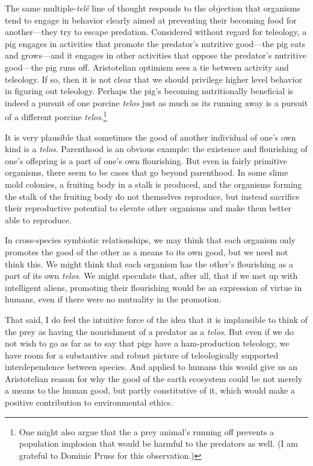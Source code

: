 The same multiple-\textit{tel\^e} line of thought responds to the objection that organisms tend 
to engage in behavior clearly aimed at preventing their becoming
food for another---they try to escape predation. Considered without regard for teleology, a pig engages
in activities that promote the predator's nutritive good---the pig eats and grows---and it engages
in other activities that oppose the predator's nutritive good---the pig runs off. Aristotelian optimism
sees a tie between activity and teleology. If so, then it is not clear that we should privilege higher
level behavior in figuring out teleology. Perhaps the pig's becoming nutritionally beneficial is indeed
a pursuit of one porcine \textit{telos} just as much as its running away is a pursuit of a different
porcine \textit{telos}.\footnote{One might also argue that the a prey animal's running off prevents a population
implosion that would be harmful to the predators as well. (I am grateful to Dominic Pruss for this 
observation.)}

It is very plausible that sometimes the good of another individual of one's own kind is a \textit{telos}.
Parenthood is an obvious example: the existence and flourishing of one's offspring is a part of one's
own flourishing. But even in fairly primitive organisms, there seem to be cases that go beyond parenthood.
In some slime mold colonies, a fruiting body in a stalk is produced, and the organisms forming the stalk of the fruiting body do
not themselves reproduce, but instead sacrifice their reproductive potential to elevate other organisms
and make them better able to reproduce. 

In cross-species symbiotic relationships, we may think that each organism only promotes the good of the 
other as a means to its own good, but we need not think this. We might think that each organism has the
other's flourishing as a part of its own \textit{telos}. We might speculate that, after all, that if we
met up with intelligent aliens, promoting their flourishing would be an expression of virtue in
humans, even if there were no mutuality in the promotion.

That said, I do feel the intuitive force of the idea that it is implausible to think of the prey as having the
nourishment of a predator as a \textit{telos}. But even if we do not wish to go as far as to say that pigs
have a ham-production teleology, we have room for a substantive and robust picture of teleologically supported
interdependence between species. And applied to humans this would give us an Aristotelian reason for why the good of the earth ecosystem 
could be not merely a means to the human good, but partly constitutive of it, which would make a positive
contribution to environmental ethics. 

